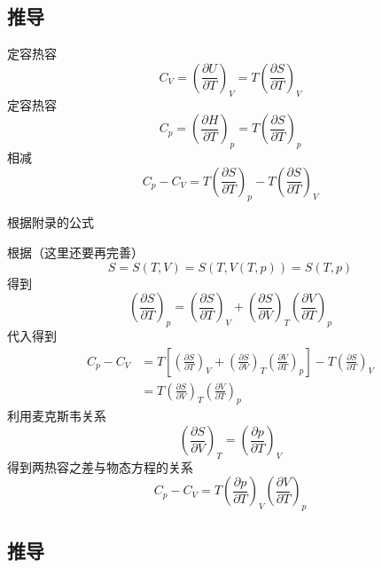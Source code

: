 \subsection{推导}
定容热容
\begin{equation}
    C_V=\left( \frac{\partial U}{\partial T} \right) _V=T\left( \frac{\partial S}{\partial T} \right) _V
\end{equation}
定容热容
\begin{equation}
    C_p=\left( \frac{\partial H}{\partial T} \right) _p=T\left( \frac{\partial S}{\partial T} \right) _p
\end{equation}
相减
\begin{equation}
    C_p-C_V=T\left( \frac{\partial S}{\partial T} \right) _p-T\left( \frac{\partial S}{\partial T} \right) _V
\end{equation}

根据附录的公式

根据（这里还要再完善）
\begin{equation}
    S=S(T,V)=S(T,V(T,p))=S(T,p)
\end{equation}
得到
\begin{equation}
    \left( \frac{\partial S}{\partial T} \right) _p=\left( \frac{\partial S}{\partial T} \right) _V+\left( \frac{\partial S}{\partial V} \right) _T\left( \frac{\partial V}{\partial T} \right) _p
\end{equation}
代入得到
\begin{equation}
    \begin{aligned}
        C_p-C_V&=T\left[ \left( \frac{\partial S}{\partial T} \right) _V+\left( \frac{\partial S}{\partial V} \right) _T\left( \frac{\partial V}{\partial T} \right) _p \right] -T\left( \frac{\partial S}{\partial T} \right) _V
\\
&=T\left( \frac{\partial S}{\partial V} \right) _T\left( \frac{\partial V}{\partial T} \right) _p
    \end{aligned}
\end{equation}
利用麦克斯韦关系
\begin{equation}
    \left( \frac{\partial S}{\partial V} \right) _T=\left( \frac{\partial p}{\partial T} \right) _V
\end{equation}
得到两热容之差与物态方程的关系
\begin{equation}
    C_p-C_V=T\left( \frac{\partial p}{\partial T} \right) _V\left( \frac{\partial V}{\partial T} \right) _p
\end{equation}


\subsection{推导}

